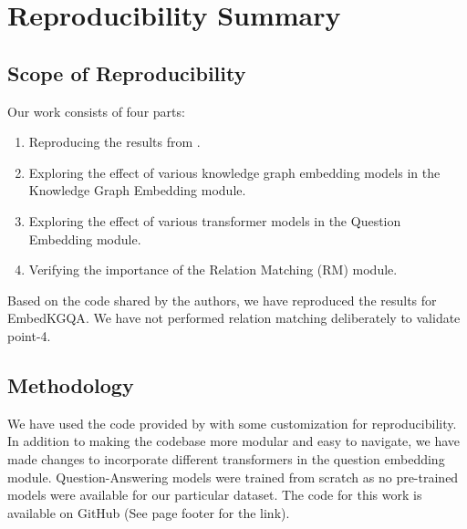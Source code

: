 \section{Reproducibility Summary}


\subsection{Scope of Reproducibility}
Our work consists of four parts: 
\begin{enumerate}
\item Reproducing the results from \cite{saxena-etal-2020-improving}.
\item Exploring the effect of various knowledge graph embedding models in the Knowledge Graph Embedding module.
\item Exploring the effect of various transformer models in the Question Embedding module.
\item Verifying the importance of the Relation Matching (RM) module.
\end{enumerate}

Based on the code shared by the authors, we have reproduced the results for EmbedKGQA\cite{saxena-etal-2020-improving}. We have not performed relation matching deliberately to validate point-4.

\subsection{Methodology}

We have used the code provided by \cite{saxena-etal-2020-improving} with some customization for reproducibility. In addition to making the codebase more modular and easy to navigate, we have made changes to incorporate different transformers in the question embedding module. Question-Answering models were trained from scratch as no pre-trained models were available for our particular dataset. The code for this work is available on GitHub (See page footer for the link).

